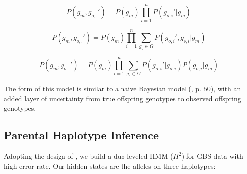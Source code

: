 \documentclass[11pt]{article}
\begin{document}
$$
P(g_m, g_{o,.}') = P(g_m) \prod_{i = 1}^n P(g_{o,i}' | g_m)
$$

$$
P(g_m, g_{o,.}') = P(g_m) \prod_{i = 1}^n \sum_{g_o \in \Omega} P(g_{o,i}', g_{o,i} | g_m)
$$

\begin{equation}
  P(g_m, g_{o,.}') = P(g_m) \prod_{i = 1}^n \sum_{g_o \in \Omega} P(g_{o,i}' | g_{o,i}) P(g_{o,i} | g_{m})
\end{equation}

The form of this model is similar to a naive Bayesian model
(\citealt{koller2009}, p. 50), with an added layer of uncertainty from true
offspring genotypes to observed offspring genotypes.

%
%

\subsection{Parental Haplotype Inference}

Adopting the design of \citep{browning2009unified}, we build a duo leveled HMM
($H^2$) for GBS data with high error rate. Our hidden states are the alleles on
three haplotypes: 





\end{document}

